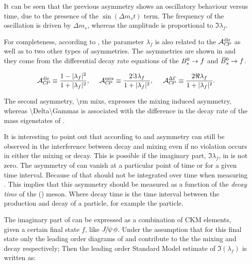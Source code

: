 \noindent It can be seen that the previous asymmetry shows an oscillatory behaviour versus time, due
to the presence of the $\sin(\Delta m_s t)$ term. The frequency of the oscillation is driven by $\Delta m_s$, whereas
the amplitude is proportional to $\Im\lambda_f$.

For completeness, according to \cite{DeBruyn-thesis,jeroenThesis}, the parameter $\lambda_f$ is also related to the $\mathcal{A}_{C\!P}^{\rm dir}$ as well as to two
other types of asymmetries. The asymmetries are shown in  and they come from the differential decay rate equations of the $B^0_s\rightarrow f$
 and $\kern 0.18em\overline{\kern -0.18em B}{}^0_s\rightarrow f$.

\begin{equation}
  \centering
  \Acp{\rm dir}      \equiv \frac{ 1-|\lambda_f|^2} {1 + |\lambda_f|^2},\;\;\;\;\;
  \Acp{\rm mix}      \equiv \frac{ 2 \Im\lambda_f} {1 + |\lambda_f|^2},\;\;\;\;\;
  \Acp{\Delta\Gamma} \equiv \frac{ 2 \Re\lambda_f} {1 + |\lambda_f|^2}.
\label{cp_asym_lambda}
\end{equation}

\noindent The second asymmetry, \Acp{\rm mix}, expresses the mixing induced \CP asymmetry, whereas \Acp{\Delta\Gamma} is associated with the
difference in the decay rate of the mass eigenstates of .

It is interesting to point out that according to  and  \CP asymmetry
can still be observed in the interference between decay and
mixing even if no \CP violation occurs in either the mixing or decay. This is possible if the imaginary part,
$\Im\lambda_f$, in  is not zero. The asymmetry of  can vanish at a
particular point of time or for a given time interval. Because of that  should not
be integrated over time when measuring \phis. This implies that this asymmetry should be measured as
a function of the {\it decay time} of the \Bs (\Bsb) meson. Where decay time is the time interval between
the production and decay of a particle, for example the \Bs particle.

The imaginary part of  can be expressed as a combination of CKM elements, given a certain final state $f$, like ${J\mskip -3mu/\mskip -2mu\psi\mskip 2mu}\phi$.
Under the assumption that for this final state only the leading order diagrams of  and  contribute to the
the \BBbarSyst mixing and decay respectively; Then the leading order Standard Model estimate of $\Im(\lambda_f)$ is written as:

